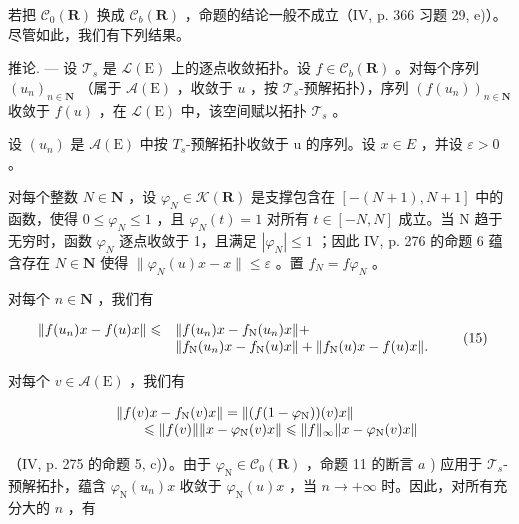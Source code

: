 若把 \(\mathcal{C}_{0}(\mathbf{R})\) 换成 \(\mathcal{C}_{b}(\mathbf{R})\) ，命题的结论一般不成立（IV, p. 366 习题 29, e)）。尽管如此，我们有下列结果。

推论. --- 设 \(\mathcal{T}_{s}\) 是 \(\mathcal{L}(\mathrm{E})\) 上的逐点收敛拓扑。设 \(f \in \mathcal{C}_{b}(\mathbf{R})\) 。对每个序列 \((u_{n})_{n \in \mathbf{N}}\) （属于 \(\mathcal{A}(\mathrm{E})\) ，收敛于 \(u\) ，按 \(\mathcal{T}_{s}\)-预解拓扑），序列 \((f(u_{n}))_{n \in \mathbf{N}}\) 收敛于 \(f(u)\) ，在 \(\mathcal{L}(\mathrm{E})\) 中，该空间赋以拓扑 \(\mathcal{T}_{s}\) 。

设 \((u_{n})\) 是 \(\mathcal{A}(\mathrm{E})\) 中按 \(T_{s}\)-预解拓扑收敛于 u 的序列。设 \(x \in E\) ，并设 \(\varepsilon > 0\) 。

对每个整数 \(N \in \mathbf{N}\) ，设 \(\varphi_{N} \in \mathcal{K}(\mathbf{R})\) 是支撑包含在 \([-(N+1), N+1]\) 中的函数，使得 \(0 \leqslant \varphi_{N} \leqslant 1\) ，且 \(\varphi_{N}(t) = 1\) 对所有 \(t \in [-N, N]\) 成立。当 N 趋于无穷时，函数 \(\varphi_{N}\) 逐点收敛于 1，且满足 \(|\varphi_{N}| \leqslant 1\) ；因此 IV, p. 276 的命题 6 蕴含存在 \(N \in \mathbf{N}\) 使得 \(\|\varphi_{N}(u)x - x\| \leqslant \varepsilon\) 。置 \(f_{N} = f\varphi_{N}\) 。

对每个 \(n\in \mathbf{N}\) ，我们有

\[
\begin{array}{r l} \| f (u _ {n}) x - f (u) x \| \leqslant & \| f (u _ {n}) x - f _ {\mathrm{N}} (u _ {n}) x \| + \\ & \| f _ {\mathrm{N}} (u _ {n}) x - f _ {\mathrm{N}} (u) x \| + \| f _ {\mathrm{N}} (u) x - f (u) x \|. \end{array} \tag {15}
\]

对每个 \(v\in \mathcal{A}(\mathrm{E})\) ，我们有

\[
\begin{array}{r l} & {\| f (v) x - f _ {\mathrm{N}} (v) x \| = \| (f (1 - \varphi_ {\mathrm{N}})) (v) x \|} \\ & {\qquad \leqslant \| f (v) \|   \| x - \varphi_ {\mathrm{N}} (v) x \| \leqslant \| f \| _ {\infty}   \| x - \varphi_ {\mathrm{N}} (v) x \|} \end{array}
\]

（IV, p. 275 的命题 5, c)）。由于 \(\varphi_{\mathrm{N}} \in \mathcal{C}_0(\mathbf{R})\) ，命题 11 的断言 \(a\) ) 应用于 \(\mathcal{T}_s\)-预解拓扑，蕴含 \(\varphi_{\mathrm{N}}(u_n)x\) 收敛于 \(\varphi_{\mathrm{N}}(u)x\) ，当 \(n \to +\infty\) 时。因此，对所有充分大的 \(n\) ，有

